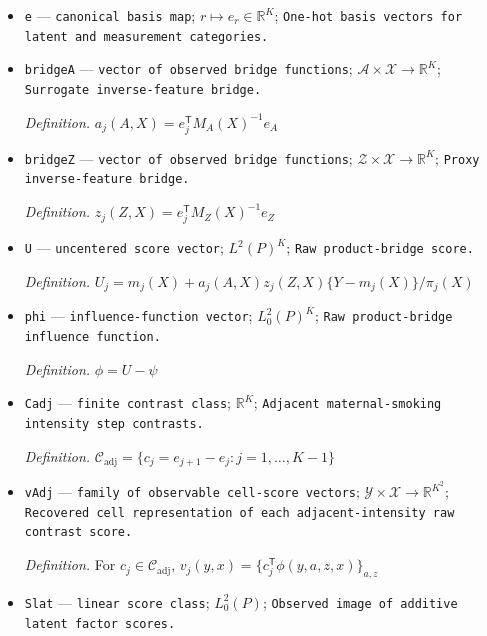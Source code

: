 \documentclass{article}
\begin{document}
\begin{itemize}
  \par\smallskip\noindent\emph{Definition.} \(R_{(a,z),j}(y,x)=P(J=j\mid Y=y,A=a,Z=z,X=x)\) and, cellwise, \(R(y,x)=D(y,x)^{-1}B(x)W(y,x)\)
  \item \texttt{e} --- \texttt{canonical basis map}; \(r\mapsto e_r\in\mathbb R^K\); \texttt{One-\allowbreak{}hot basis vectors for latent and measurement categories.}
  \item \texttt{bridgeA} --- \texttt{vector of observed bridge functions}; \(\mathcal A\times\mathcal X\to\mathbb R^{K}\); \texttt{Surrogate inverse-\allowbreak{}feature bridge.}
  \par\smallskip\noindent\emph{Definition.} \(a_j(A,X)=e_j^{\mathsf T}M_A(X)^{-1}e_A\)
  \item \texttt{bridgeZ} --- \texttt{vector of observed bridge functions}; \(\mathcal Z\times\mathcal X\to\mathbb R^{K}\); \texttt{Proxy inverse-\allowbreak{}feature bridge.}
  \par\smallskip\noindent\emph{Definition.} \(z_j(Z,X)=e_j^{\mathsf T}M_Z(X)^{-1}e_Z\)
  \item \texttt{U} --- \texttt{uncentered score vector}; \(L^{2}(P)^{K}\); \texttt{Raw product-\allowbreak{}bridge score.}
  \par\smallskip\noindent\emph{Definition.} \(U_j=m_j(X)+a_j(A,X)z_j(Z,X)\{Y-m_j(X)\}/\pi_j(X)\)
  \item \texttt{phi} --- \texttt{influence-\allowbreak{}function vector}; \(L^{2}_{0}(P)^{K}\); \texttt{Raw product-\allowbreak{}bridge influence function.}
  \par\smallskip\noindent\emph{Definition.} \(\phi=U-\psi\)
  \item \texttt{Cadj} --- \texttt{finite contrast class}; \(\mathbb R^{K}\); \texttt{Adjacent maternal-\allowbreak{}smoking intensity step contrasts.}
  \par\smallskip\noindent\emph{Definition.} \(\mathcal C_{\mathrm{adj}}=\{c_j=e_{j+1}-e_j:j=1,\ldots,K-1\}\)
  \item \texttt{vAdj} --- \texttt{family of observable cell-\allowbreak{}score vectors}; \(\mathcal Y\times\mathcal X\to\mathbb R^{K^{2}}\); \texttt{Recovered cell representation of each adjacent-\allowbreak{}intensity raw contrast score.}
  \par\smallskip\noindent\emph{Definition.} For \(c_j\in\mathcal C_{\mathrm{adj}}\), \(v_j(y,x)=\{c_j^{\mathsf T}\phi(y,a,z,x)\}_{a,z}\)
  \item \texttt{Slat} --- \texttt{linear score class}; \(L^{2}_{0}(P)\); \texttt{Observed image of additive latent factor scores.}

\end{itemize}
\end{document}
